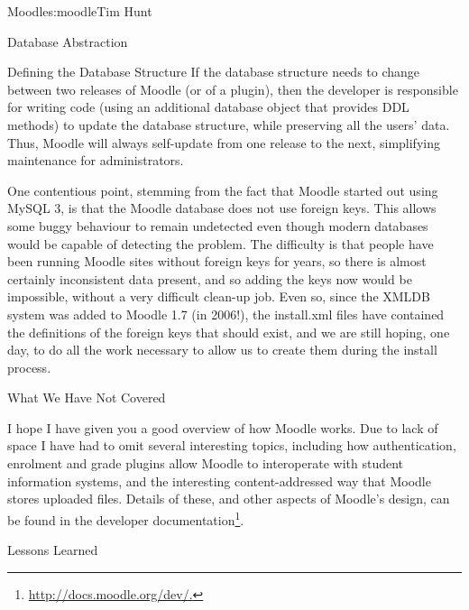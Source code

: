 \begin{aosachapter}{Moodle}{s:moodle}{Tim Hunt}
\begin{aosasect1}{Database Abstraction}
\begin{aosasect2}{Defining the Database Structure}
If the database structure needs to change between two releases of
Moodle (or of a plugin), then the developer is responsible for writing
code (using an additional database object that provides DDL methods)
to update the database structure, while preserving all the users'
data. Thus, Moodle will always self-update from one release to the
next, simplifying maintenance for administrators.

One contentious point, stemming from the fact that Moodle started out
using MySQL 3, is that the Moodle database does not use foreign
keys. This allows some buggy behaviour to remain undetected even
though modern databases would be capable of detecting the problem. The
difficulty is that people have been running Moodle sites without
foreign keys for years, so there is almost certainly inconsistent data
present, and so adding the keys now would be impossible, without a
very difficult clean-up job. Even so, since the XMLDB system was added
to Moodle 1.7 (in 2006!), the install.xml files have contained the
definitions of the foreign keys that should exist, and we are still
hoping, one day, to do all the work necessary to allow us to create
them during the install process.

\end{aosasect2}

\end{aosasect1}

\begin{aosasect1}{What We Have Not Covered}

I hope I have given you a good overview of how Moodle works. Due to
lack of space I have had to omit several interesting topics, including
how authentication, enrolment and grade plugins allow Moodle to
interoperate with student information systems, and the interesting
content-addressed way that Moodle stores uploaded files. Details of
these, and other aspects of Moodle's design, can be found in the
developer documentation\footnote{\url{http://docs.moodle.org/dev/.}}.

\end{aosasect1}

\begin{aosasect1}{Lessons Learned}


\end{aosasect1}
\end{aosachapter}
